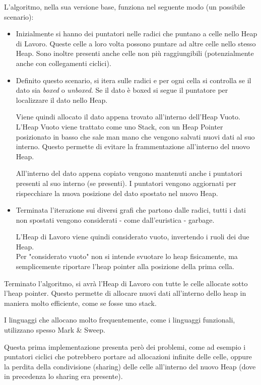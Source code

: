 \documentclass{article}
\begin{document}
L'algoritmo, nella sua versione base, funziona nel seguente modo (un possibile scenario):
\begin{itemize}
    \item Inizialmente si hanno dei puntatori nelle radici che puntano a celle nello Heap di Lavoro. Queste celle a loro volta possono puntare ad altre celle nello stesso Heap. Sono inoltre presenti anche celle non più raggiungibili (potenzialmente anche con collegamenti ciclici).
    \item Definito questo scenario, si itera sulle radici e per ogni cella si controlla se il dato sia \textit{boxed} o \textit{unboxed}. Se il dato è boxed si segue il puntatore per localizzare il dato nello Heap.
    
    Viene quindi allocato il dato appena trovato all'interno dell'Heap Vuoto. L'Heap Vuoto viene trattato come uno Stack, con un Heap Pointer posizionato in basso che sale man mano che vengono salvati nuovi dati al suo interno. Questo permette di evitare la frammentazione all'interno del nuovo Heap.

    All'interno del dato appena copiato vengono mantenuti anche i puntatori presenti al suo interno (se presenti). I puntatori vengono aggiornati per rispecchiare la nuova posizione del dato spostato nel nuovo Heap.
    \item Terminata l'iterazione sui diversi grafi che partono dalle radici, tutti i dati non spostati vengono considerati - come dall'euristica - garbage.

    L'Heap di Lavoro viene quindi considerato vuoto, invertendo i ruoli dei due Heap.\\
    Per "considerato vuoto" non si intende svuotare lo heap fisicamente, ma semplicemente riportare l'heap pointer alla posizione della prima cella.
\end{itemize}
\vspace{8pt}
Terminato l'algoritmo, si avrà l'Heap di Lavoro con tutte le celle allocate sotto l'heap pointer. Questo permette di allocare nuovi dati all'interno dello heap in maniera molto efficiente, come se fosse uno stack.

I linguaggi che allocano molto frequentemente, come i linguaggi funzionali, utilizzano spesso Mark \& Sweep. 

\vspace{8pt}
Questa prima implementazione presenta però dei problemi, come ad esempio i puntatori ciclici che potrebbero portare ad allocazioni infinite delle celle, oppure la perdita della condivisione (sharing) delle celle all'interno del nuovo Heap (dove in precedenza lo sharing era presente).
\end{document}
